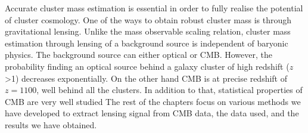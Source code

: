 Accurate cluster mass estimation is essential in order to fully realise the potential of cluster cosmology.
One of the ways to obtain robust cluster mass is through gravitational lensing. 
Unlike the mass observable scaling relation, cluster mass estimation through lensing of a background source is independent of baryonic physics. 
The background source can either optical or CMB. 
However, the probability finding an optical source behind a galaxy cluster of high redshift ($z$ >1) decreases exponentially. 
On the other hand CMB is at precise redshift of $z  = 1100$, well behind all the clusters.
In addition to that, statistical properties of CMB are very well studied 
The rest of the chapters focus on various methods we have developed to extract lensing signal from CMB data, the data used, and the results we have obtained. 



  

 

 
 

   